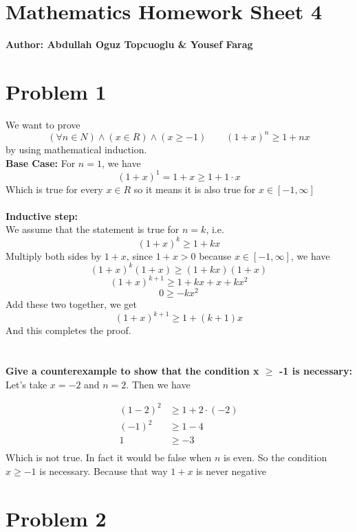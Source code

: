 \documentclass{article}
\begin{document}
\section*{\huge Mathematics Homework Sheet 4}
\begin{flushright}
   \textbf{Author: Abdullah Oguz Topcuoglu \& Yousef Farag}
\end{flushright}

\section*{Problem 1}
We want to prove
\[
   (\forall n \in N) \land (x \in R) \land (x \geq -1) \qquad (1 + x)^n \geq 1 + nx
\]
by using mathematical induction.\\
\textbf{Base Case:} For $n = 1$, we have
\[
   (1 + x)^1 = 1 + x \geq 1 + 1 \cdot x
\]
Which is true for every \(x \in R\) so it means it is also true for \(x \in [-1, \infty]\)\\
\\
\textbf{Inductive step:} \\
We assume that the statement is true for \(n = k\), i.e.
\[
   (1 + x)^k \geq 1 + kx
\]
Multiply both sides by \(1 + x\), since \(1 + x > 0\) because \(x \in [-1, \infty]\), we have
\[
   (1 + x)^{k} (1 + x) \geq (1 + kx)(1 + x)
\]
\[
   (1 + x)^{k + 1} \geq 1 + kx + x + kx^2
\]
\[
   0 \geq -kx^2
\]
Add these two together, we get
\[
   (1 + x)^{k + 1} \geq 1 + (k + 1)x
\]
And this completes the proof.\\
\\
\\
\textbf{Give a counterexample to show that the condition x \(\geq\) -1 is necessary:}\\
Let's take \(x = -2\) and \(n = 2\). Then we have

\begin{align*}
   (1 - 2)^2 &\geq 1 + 2 \cdot (-2) \\
   (-1)^2    &\geq 1 - 4            \\
   1         &\geq -3               \\
\end{align*}
Which is not true. In fact it would be false when \(n\) is even. So the condition \(x \geq -1\) is necessary. Because that way \(1 + x\) is never negative

\section*{Problem 2}
\end{document}
